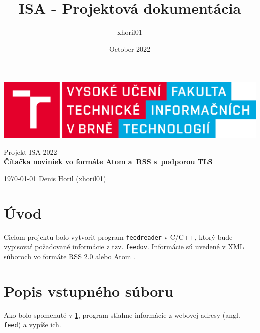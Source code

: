 \documentclass[a4paper, 11pt]{article}
\title{ISA - Projektová dokumentácia}
\author{xhoril01}
\date{October 2022}
\begin{document}
    \begin{titlepage}
        \begin{center}
            \includegraphics[width=0.8\linewidth]{./img/VUT_LOGO} \\
            

			\Huge{Projekt ISA 2022} \\
			\LARGE{\textbf{Čítačka noviniek vo formáte Atom a~RSS s~podporou TLS}} \\

		\end{center}

		{\Large
			\today
			\hfill
			Denis Horil (xhoril01)
		}
    \end{titlepage}

    \color{black}
    \setcounter{page}{1}
    \tableofcontents
    \clearpage

    \setcounter{page}{1}
    \section{Úvod}
    \label{intro}

    Cieľom projektu bolo vytvoriť program \texttt{feedreader} v C/C++, ktorý bude vypisovať požadované informácie z tzv. \texttt{feedov}. Informácie sú uvedené v XML súboroch vo formáte RSS 2.0 \cite{rss2} alebo Atom \cite{atom}. \\

    \section{Popis vstupného súboru}
    \label{feeds}

    Ako bolo spomenuté v \ref{intro}, program stiahne informácie z webovej adresy (angl. \texttt{feed}) a vypíše ich.\\
\end{document}
